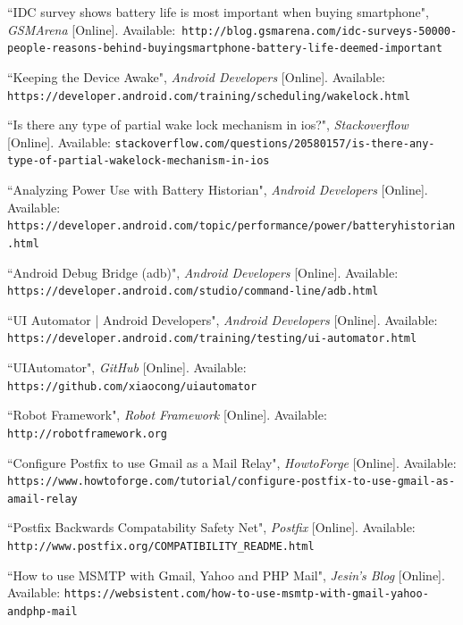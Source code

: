 \documentclass[a4paper,12pt]{article}
\begin{document}

\begin{thebibliography}{1}

 ``IDC survey shows battery life is most important when buying smartphone", \textit{GSMArena} [Online]. Available:\texttt{ http://blog.gsmarena.com/idc-surveys-50000-people-reasons-behind-buying\-smartphone-battery-life-deemed-important}
 
``Keeping the Device Awake", \textit{Android Developers} [Online]. Available: \texttt{https://developer.android.com/training/scheduling/wakelock.html} 
 
 ``Is there any type of partial wake lock mechanism in ios?", \textit{Stackoverflow} [Online]. Available: \texttt{stackoverflow.com/questions/20580157/is-there-any-type-of-partial-wake\-lock-mechanism-in-ios}

``Analyzing Power Use with Battery Historian", \textit{Android Developers} [Online]. Available: \texttt{https://developer.android.com/topic/performance/power/battery\-historian.html}

``Android Debug Bridge (adb)", \textit{Android Developers} [Online]. Available: \texttt{https://developer.android.com/studio/command-line/adb.html}

``UI Automator | Android Developers", \textit{Android Developers} [Online]. Available: \texttt{https://developer.android.com/training/testing/ui-automator.html}

``UIAutomator", \textit{GitHub} [Online]. Available: \texttt{https://github.com/xiaocong/uiautomator}

``Robot Framework", \textit{Robot Framework} [Online]. Available: \texttt{http://robotframework.org}

``Configure Postfix to use Gmail as a Mail Relay", \textit{HowtoForge} [Online]. Available: \texttt{https://www.howtoforge.com/tutorial/configure-postfix-to-use-gmail-as-a\-mail-relay}

``Postfix Backwards Compatability Safety Net", \textit{Postfix} [Online]. Available: \texttt{http://www.postfix.org/COMPATIBILITY\_README.html}

``How to use MSMTP with Gmail, Yahoo and PHP Mail", \textit{Jesin's Blog} [Online]. Available: \texttt{https://websistent.com/how-to-use-msmtp-with-gmail-yahoo-and\-php-mail}
\end{thebibliography}
\end{document}
